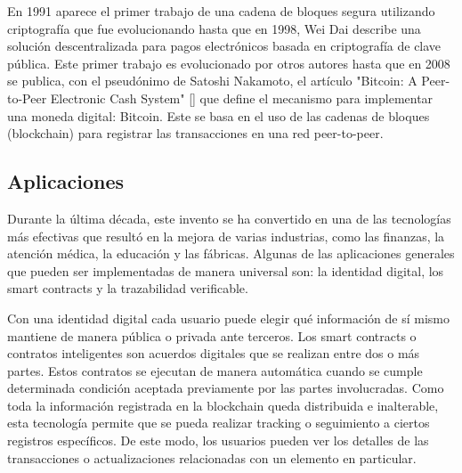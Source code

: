 En 1991 aparece el primer trabajo de una cadena de bloques segura utilizando criptografía que fue evolucionando hasta que en 1998, Wei Dai describe una solución descentralizada para pagos electrónicos basada en criptografía de clave pública. Este primer trabajo es evolucionado por otros autores hasta que en 2008 se publica, con el pseudónimo de Satoshi Nakamoto, el artículo "Bitcoin: A Peer-to-Peer Electronic Cash System" [\cite{nakamoto2008bitcoin}] que define el mecanismo para implementar una moneda digital: Bitcoin. Este se basa en el uso de las cadenas de bloques (blockchain) para registrar las transacciones en una red peer-to-peer.

\subsection{Aplicaciones}
Durante la última década, este invento se ha convertido en una de las tecnologías más efectivas que resultó en la mejora de varias industrias, como las finanzas, la atención médica, la educación y las fábricas. Algunas de las aplicaciones generales que pueden ser implementadas de manera universal son: la identidad digital, los smart contracts y la trazabilidad verificable.

Con una identidad digital cada usuario puede elegir qué información de sí mismo mantiene de manera pública o privada ante terceros. Los smart contracts o contratos inteligentes son acuerdos digitales que se realizan entre dos o más partes. Estos contratos se ejecutan de manera automática cuando se cumple determinada condición aceptada previamente por las partes involucradas. Como toda la información registrada en la blockchain queda distribuida e inalterable, esta tecnología permite que se pueda realizar tracking o seguimiento a ciertos registros específicos. De este modo, los usuarios pueden ver los detalles de las transacciones o actualizaciones relacionadas con un elemento en particular.

